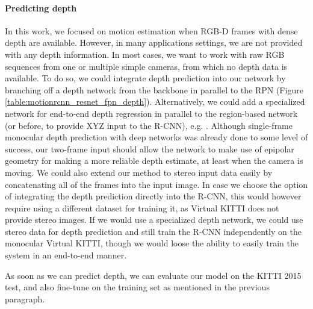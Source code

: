 \paragraph{Predicting depth}
In this work, we focused on motion estimation when RGB-D frames with dense depth are available.
However, in many applications settings, we are not provided with any depth information.
In most cases, we want to work with raw RGB sequences from one or multiple simple cameras,
from which no depth data is available.
To do so, we could integrate depth prediction into our network by branching off a
depth network from the backbone in parallel to the RPN (Figure \ref{table:motionrcnn_resnet_fpn_depth}).
Alternatively, we could add a specialized network for end-to-end depth regression
in parallel to the region-based network (or before, to provide XYZ input to the R-CNN), e.g. \cite{GCNet}.
Although single-frame monocular depth prediction with deep networks was already done
to some level of success,
our two-frame input should allow the network to make use of epipolar
geometry for making a more reliable depth estimate, at least when the camera
is moving. We could also extend our method to stereo input data easily by concatenating
all of the frames into the input image.
In case we choose the option of integrating the depth prediction directly into
the R-CNN,
this would however require using a different dataset for training it, as Virtual KITTI does not
provide stereo images.
If we would use a specialized depth network, we could use stereo data
for depth prediction and still train the R-CNN independently on the monocular Virtual KITTI,
though we would loose the ability to easily train the system in an end-to-end manner.

As soon as we can predict depth, we can evaluate our model on the KITTI 2015 test,
and also fine-tune on the training set as mentioned in the previous paragraph.

